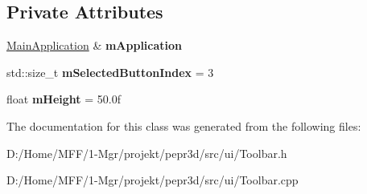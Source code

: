 \subsection*{Private Attributes}
\begin{DoxyCompactItemize}
\item 
\mbox{\label{classpepr3d_1_1_toolbar_a29f26071f02ab35bdaa35cd08326766a}} 
\mbox{\hyperlink{classpepr3d_1_1_main_application}{Main\+Application}} \& {\bfseries m\+Application}
\item 
\mbox{\label{classpepr3d_1_1_toolbar_af5cb57247638ff59f7dc9fef191fdcf3}} 
std\+::size\+\_\+t {\bfseries m\+Selected\+Button\+Index} = 3
\item 
\mbox{\label{classpepr3d_1_1_toolbar_aea711be10561a98a3736e87570463b02}} 
float {\bfseries m\+Height} = 50.\+0f
\end{DoxyCompactItemize}


The documentation for this class was generated from the following files\+:\begin{DoxyCompactItemize}
\item 
D\+:/\+Home/\+M\+F\+F/1-\/\+Mgr/projekt/pepr3d/src/ui/Toolbar.\+h\item 
D\+:/\+Home/\+M\+F\+F/1-\/\+Mgr/projekt/pepr3d/src/ui/Toolbar.\+cpp\end{DoxyCompactItemize}
